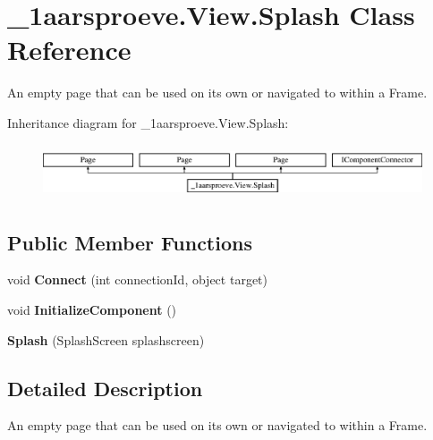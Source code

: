 \hypertarget{class__1aarsproeve_1_1_view_1_1_splash}{}\section{\+\_\+1aarsproeve.\+View.\+Splash Class Reference}
\label{class__1aarsproeve_1_1_view_1_1_splash}


An empty page that can be used on its own or navigated to within a Frame.  


Inheritance diagram for \+\_\+1aarsproeve.\+View.\+Splash\+:\begin{figure}[H]
\begin{center}
\leavevmode
\includegraphics[height=1.618497cm]{class__1aarsproeve_1_1_view_1_1_splash}
\end{center}
\end{figure}
\subsection*{Public Member Functions}
\begin{DoxyCompactItemize}
\item 
\hypertarget{class__1aarsproeve_1_1_view_1_1_splash_adeb8f9f8b3f85dd26f771c079d470c30}{}void {\bfseries Connect} (int connection\+Id, object target)\label{class__1aarsproeve_1_1_view_1_1_splash_adeb8f9f8b3f85dd26f771c079d470c30}

\item 
\hypertarget{class__1aarsproeve_1_1_view_1_1_splash_ad5f0acfb3d905466af7b8fc7539c9032}{}void {\bfseries Initialize\+Component} ()\label{class__1aarsproeve_1_1_view_1_1_splash_ad5f0acfb3d905466af7b8fc7539c9032}

\item 
\hypertarget{class__1aarsproeve_1_1_view_1_1_splash_a82ad086a4f33a2a3dcddc2a0d2a35e38}{}{\bfseries Splash} (Splash\+Screen splashscreen)\label{class__1aarsproeve_1_1_view_1_1_splash_a82ad086a4f33a2a3dcddc2a0d2a35e38}

\end{DoxyCompactItemize}


\subsection{Detailed Description}
An empty page that can be used on its own or navigated to within a Frame. 



